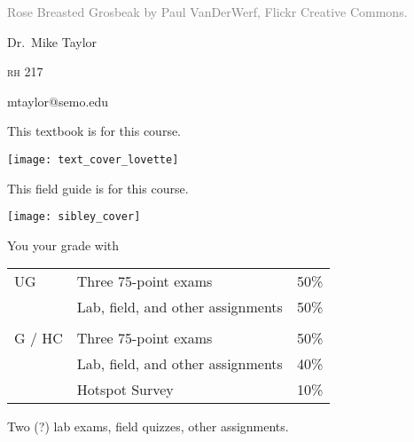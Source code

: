 \documentclass[t]{beamer}
\begin{document}


{
\begin{frame}[b,plain]
	\tiny\textcolor{gray}{Rose Breasted Grosbeak by Paul VanDerWerf, Flickr Creative Commons.}
\end{frame}
}

{
\begin{frame}[t]
	\large
	\vspace{2ex}
	\hangpara\hspace{15em} Dr.~Mike Taylor

	\hangpara\hspace{15em} \textsc{rh} 217

	\hangpara\hspace{15em} mtaylor@semo.edu
	
\end{frame}
}


\begin{frame}[t,plain]{This textbook is  for this course.}
	\begin{center}
		\vspace{-\baselineskip}
		\texttt{[image: text\_cover\_lovette]}
	\end{center}
\end{frame}

\begin{frame}[t,plain]{This field guide is  for this course.}
	\begin{center}
		\vspace{-\baselineskip}
		\texttt{[image: sibley\_cover]}
	\end{center}
\end{frame}


\begin{frame}[t]{You  your grade with}
	\begin{center}\large\begin{tabular}{@{}lll@{}}
	UG		&	Three 75-point exams 				& 	50\% \\
			&	Lab, field, and other assignments	&   50\% \\
			&										&	\\
	G / HC	&	Three 75-point exams 				& 	50\% \\
			&	Lab, field, and other assignments	&   40\% \\
			&	Hotspot Survey 						&	10\% \\
		\end{tabular}
	\end{center}

\hangpara Two (?) lab exams, field quizzes, other assignments.

\end{frame}
\end{document}

